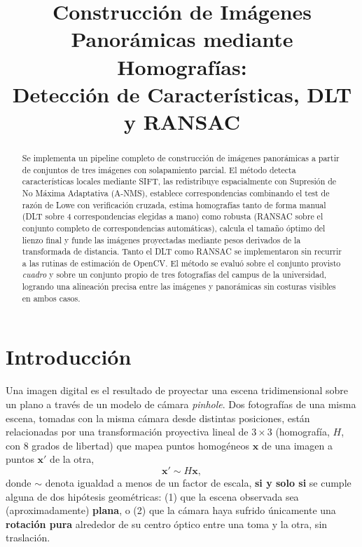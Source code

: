 \documentclass[conference]{IEEEtran}
\begin{document}
\title{Construcción de Imágenes Panorámicas mediante Homografías: \\ Detección de Características, DLT y RANSAC}

\author{
\and
{}
\and
{}
}

\maketitle

\begin{abstract}
Se implementa un pipeline completo de construcción de imágenes panorámicas a partir de conjuntos de tres imágenes con solapamiento parcial. El método detecta características locales mediante SIFT, las redistribuye espacialmente con Supresión de No Máxima Adaptativa (A-NMS), establece correspondencias combinando el test de razón de Lowe con verificación cruzada, estima homografías tanto de forma manual (DLT sobre 4 correspondencias elegidas a mano) como robusta (RANSAC sobre el conjunto completo de correspondencias automáticas), calcula el tamaño óptimo del lienzo final y funde las imágenes proyectadas mediante pesos derivados de la transformada de distancia. Tanto el DLT como RANSAC se implementaron sin recurrir a las rutinas de estimación de OpenCV. El método se evaluó sobre el conjunto provisto \textit{cuadro} y sobre un conjunto propio de tres fotografías del campus de la universidad, logrando una alineación precisa entre las imágenes y panorámicas sin costuras visibles en ambos casos.
\end{abstract}

\section{Introducción}

Una imagen digital es el resultado de proyectar una escena tridimensional sobre un plano a través de un modelo de cámara \textit{pinhole}. Dos fotografías de una misma escena, tomadas con la misma cámara desde distintas posiciones, están relacionadas por una transformación proyectiva lineal de $3\times3$ (homografía, $H$, con 8 grados de libertad) que mapea puntos homogéneos $\mathbf{x}$ de una imagen a puntos $\mathbf{x}'$ de la otra,
\begin{equation}
\mathbf{x}' \sim H\mathbf{x},
\label{eq:homografia}
\end{equation}
donde $\sim$ denota igualdad a menos de un factor de escala, \textbf{si y solo si} se cumple alguna de dos hipótesis geométricas: (1) que la escena observada sea (aproximadamente) \textbf{plana}, o (2) que la cámara haya sufrido únicamente una \textbf{rotación pura} alrededor de su centro óptico entre una toma y la otra, sin traslación.
\end{document}
